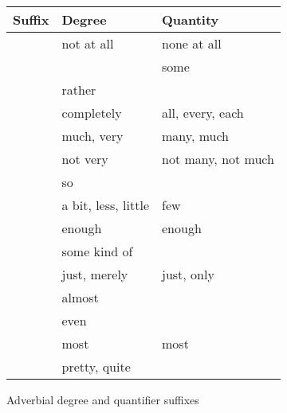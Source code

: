 \begin{figure}[tp]\centering
\caption{Adverbial degree and quantifier suffixes}
\begin{tabu} to \linewidth {X X X}
\toprule\tableheaderfont
Suffix
	& Degree
	& Quantity
	\\

\toprule
	
	& not at all
	& none at all
	\\

	& 
	& some
	\\

	& rather
	&
	\\
	
	& completely
	& all, every, each
	\\

	& much, very
	& many, much
	\\
	
	& not very
	& not many, not much
	\\
	
	& so
	&
	\\
	
	& a bit, less, little
	& few
	\\

	& enough
	& enough
	\\

	& some kind of
	&
	\\

	& just, merely
	& just, only
	\\
	
	& almost
	&
	\\

	& even
	&
	\\
	
	& most
	& most
	\\

	& pretty, quite
	&
	\\

\bottomrule
\end{tabu}
\label{fig:quantifiers}
\end{figure}

